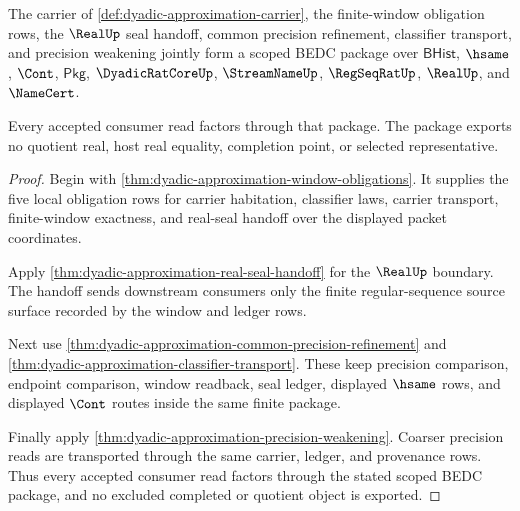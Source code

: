 \begin{theorem}
\label{thm:dyadic-approximation-kernel-scope-package}
The carrier of \autoref{def:dyadic-approximation-carrier}, the finite-window obligation rows, the $\RealUp$ seal handoff, common precision refinement, classifier transport, and precision weakening jointly form a scoped BEDC package over $\mathsf{BHist}$, $\hsame$, $\Cont$, $\mathsf{Pkg}$, $\DyadicRatCoreUp$, $\StreamNameUp$, $\RegSeqRatUp$, $\RealUp$, and $\NameCert$.

Every accepted consumer read factors through that package. The package exports no quotient real, host real equality, completion point, or selected representative.
\end{theorem}
\begin{proof}
Begin with \autoref{thm:dyadic-approximation-window-obligations}. It supplies the five local obligation rows for carrier habitation, classifier laws, carrier transport, finite-window exactness, and real-seal handoff over the displayed packet coordinates.

Apply \autoref{thm:dyadic-approximation-real-seal-handoff} for the $\RealUp$ boundary. The handoff sends downstream consumers only the finite regular-sequence source surface recorded by the window and ledger rows.

Next use \autoref{thm:dyadic-approximation-common-precision-refinement} and \autoref{thm:dyadic-approximation-classifier-transport}. These keep precision comparison, endpoint comparison, window readback, seal ledger, displayed $\hsame$ rows, and displayed $\Cont$ routes inside the same finite package.

Finally apply \autoref{thm:dyadic-approximation-precision-weakening}. Coarser precision reads are transported through the same carrier, ledger, and provenance rows. Thus every accepted consumer read factors through the stated scoped BEDC package, and no excluded completed or quotient object is exported.
\end{proof}

